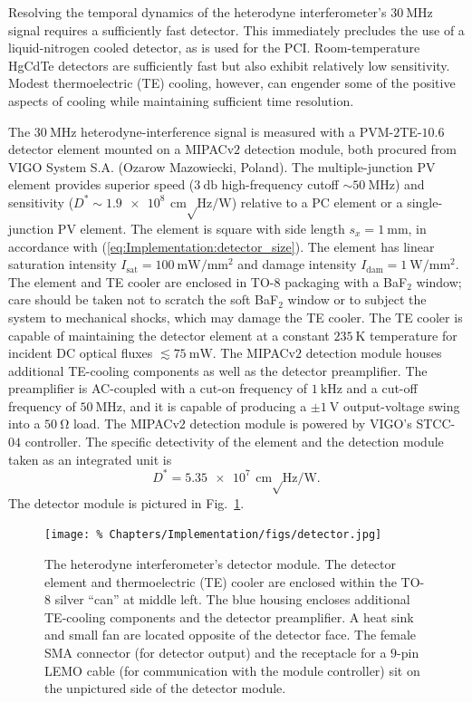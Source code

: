 Resolving the temporal dynamics
of the heterodyne interferometer's $\SI{30}{\mega\hertz}$ signal
requires a sufficiently fast detector.
This immediately precludes the use of a liquid-nitrogen cooled detector,
as is used for the PCI.
Room-temperature HgCdTe detectors are sufficiently fast but
also exhibit relatively low sensitivity.
Modest thermoelectric (TE) cooling, however,
can engender some of the positive aspects of cooling while
maintaining sufficient time resolution.

The $\SI{30}{\mega\hertz}$ heterodyne-interference signal is measured with
a {PVM-$2$TE-$10.6$} detector element mounted on a MIPACv$2$ detection module,
both procured from VIGO System S.A. (Ozarow Mazowiecki, Poland).
The multiple-junction PV element provides superior speed
($\SI{3}{\decibel}$ high-frequency cutoff $\sim \SI{50}{\mega\hertz}$) and
sensitivity ($D^* \sim \SI{1.9e8}{\centi\meter \sqrt\hertz \per\watt}$)
relative to a PC element or a single-junction PV element.
The element is square with side length $s_x = \SI{1}{\milli\meter}$,
in accordance with (\ref{eq:Implementation:detector_size}).
The element has linear saturation intensity
$I_{\text{sat}} = \SI{100}{\milli\watt\per\milli\meter\squared}$ and
damage intensity
$I_{\text{dam}} = \SI{1}{\watt\per\milli\meter\squared}$.
The element and TE cooler are enclosed
in TO-$8$ packaging with a BaF$_2$ window;
care should be taken not to scratch the soft BaF$_2$ window or
to subject the system to mechanical shocks, which
may damage the TE cooler.
The TE cooler is capable of maintaining the detector element
at a constant $\SI{235}{\kelvin}$ temperature
for incident DC optical fluxes $\lesssim \SI{75}{\milli\watt}$.
The MIPACv$2$ detection module houses additional TE-cooling components
as well as the detector preamplifier.
The preamplifier is AC-coupled with
a cut-on frequency of $\SI{1}{\kilo\hertz}$ and
a cut-off frequency of $\SI{50}{\mega\hertz}$, and
it is capable of producing a $\pm\SI{1}{\volt}$
output-voltage swing into a $\SI{50}{\ohm}$ load.
The MIPACv$2$ detection module is powered by
VIGO's STCC-$04$ controller.
The specific detectivity of the element and the detection module
taken as an integrated unit is
\begin{equation}
  D^* = \SI{5.35e7}{\centi\meter \sqrt\hertz \per\watt}.
  \label{eq:Implementation:Dstar}
\end{equation}
The detector module is pictured in
Fig.~\ref{fig:Implementation:detector}.

\begin{figure}
  \centering
  \texttt{[image: \%
    Chapters/Implementation/figs/detector.jpg]}
  \caption[Detector module]{%
    The heterodyne interferometer's detector module.
    The detector element and thermoelectric (TE) cooler
    are enclosed within the TO-$8$ silver ``can'' at middle left.
    The blue housing encloses additional TE-cooling components and
    the detector preamplifier.
    A heat sink and small fan are located opposite of the detector face.
    The female SMA connector (for detector output) and
    the receptacle for a $9$-pin LEMO cable
    (for communication with the module controller)
    sit on the unpictured side of the detector module.
  }
\label{fig:Implementation:detector}
\end{figure}


